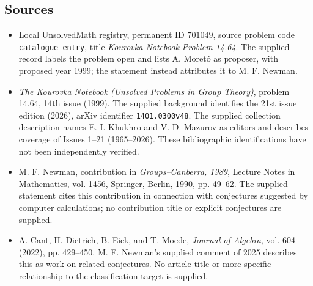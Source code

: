 \documentclass[11pt]{article}
\begin{document}
\subsection{Sources}
\begin{itemize}
\item Local UnsolvedMath registry, permanent ID \(701049\), source problem code \texttt{catalogue entry}, title \emph{Kourovka Notebook Problem 14.64}. The supplied record labels the problem open and lists A. Moret\'{o} as proposer, with proposed year 1999; the statement instead attributes it to M. F. Newman.
\item \emph{The Kourovka Notebook (Unsolved Problems in Group Theory)}, problem 14.64, 14th issue (1999). The supplied background identifies the 21st issue edition (2026), arXiv identifier \texttt{1401.0300v48}. The supplied collection description names E. I. Khukhro and V. D. Mazurov as editors and describes coverage of Issues 1--21 (1965--2026). These bibliographic identifications have not been independently verified.
\item M. F. Newman, contribution in \emph{Groups--Canberra, 1989}, Lecture Notes in Mathematics, vol. 1456, Springer, Berlin, 1990, pp. 49--62. The supplied statement cites this contribution in connection with conjectures suggested by computer calculations; no contribution title or explicit conjectures are supplied.
\item A. Cant, H. Dietrich, B. Eick, and T. Moede, \emph{Journal of Algebra}, vol. 604 (2022), pp. 429--450. M. F. Newman's supplied comment of 2025 describes this as work on related conjectures. No article title or more specific relationship to the classification target is supplied.
\end{itemize}
\end{document}
